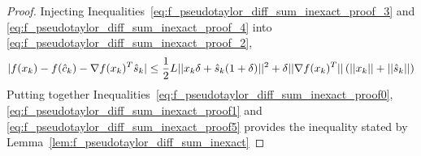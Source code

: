 \documentclass{article}[12pt]
\begin{document}
\begin{proof}
    	Injecting Inequalities~\eqref{eq:f_pseudotaylor_diff_sum_inexact_proof_3} and \eqref{eq:f_pseudotaylor_diff_sum_inexact_proof_4} into \eqref{eq:f_pseudotaylor_diff_sum_inexact_proof_2},
    	\begin{equation}
    		\label{eq:f_pseudotaylor_diff_sum_inexact_proof5}
    		|f(x_k) - f(\hat{c}_k) - \nabla f(x_k)^T\hat{s}_{k}| \leq \dfrac{1}{2}L||x_k \delta + \hat{s}_{k}(1+\delta)||^2 + \delta||\nabla f(x_k)^T||\,(||x_k||+||\hat{s}_{k}||)
    	\end{equation}
    	Putting together Inequalities~\eqref{eq:f_pseudotaylor_diff_sum_inexact_proof0}, \eqref{eq:f_pseudotaylor_diff_sum_inexact_proof1} and \eqref{eq:f_pseudotaylor_diff_sum_inexact_proof5} provides the inequality stated by Lemma~\ref{lem:f_pseudotaylor_diff_sum_inexact}
    \end{proof}
    
\end{document}
